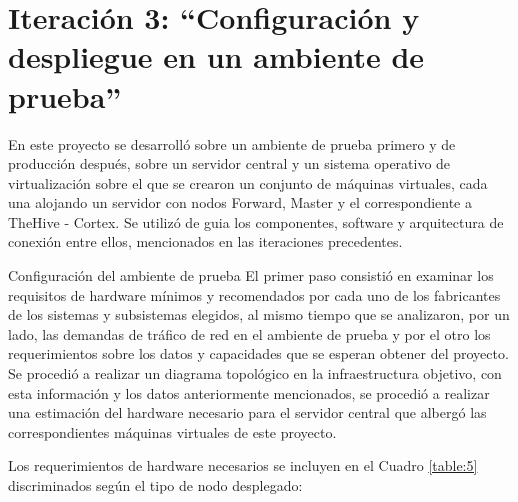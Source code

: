 \chapter{Iteración 3: “Configuración y despliegue en un ambiente de prueba”}
    En este proyecto se desarrolló sobre un ambiente de prueba primero y de producción después, sobre un servidor central y un sistema operativo de virtualización sobre el que se crearon un conjunto de máquinas virtuales, cada una alojando un servidor con nodos Forward, Master y el correspondiente a TheHive - Cortex. Se utilizó de guia los componentes, software y arquitectura de conexión entre ellos, mencionados en las iteraciones precedentes.
    
    \begin{section}{Configuración del ambiente de prueba}
        El primer paso consistió en examinar los requisitos de hardware mínimos y recomendados por cada uno de los fabricantes de los sistemas y subsistemas elegidos, al mismo tiempo que se analizaron, por un lado, las demandas de tráfico de red en el ambiente de prueba y por el otro los requerimientos sobre los datos y capacidades que se esperan obtener del proyecto. Se procedió a realizar un diagrama topológico en la infraestructura objetivo, con esta información y los datos anteriormente mencionados, se procedió a realizar una estimación del hardware necesario para el servidor central que albergó las correspondientes máquinas virtuales de este proyecto.\par
    	Los requerimientos de hardware necesarios se incluyen en el Cuadro \ref{table:5} discriminados según el tipo de nodo desplegado:
        \begin{table}[H]
        \centering
        \begin{tabular}{|m{9em}|m{9em}|m{9em}|m{9em}|}
        

\end{tabular}
\end{table}
\end{section}
